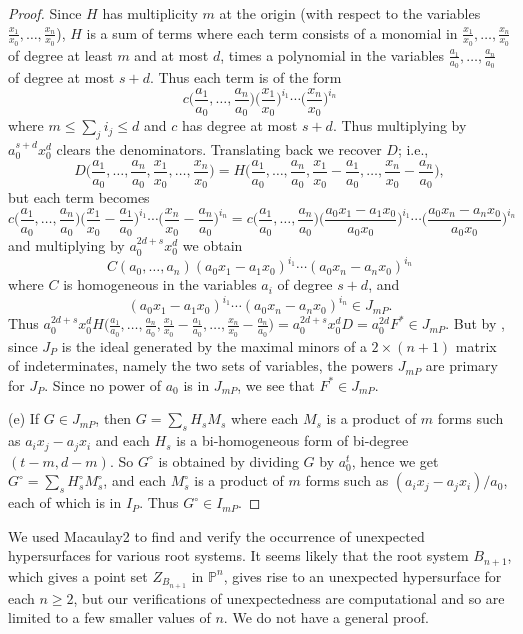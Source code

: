 \documentclass[12pt]{amsart}
\numberwithin{equation}{section}
\theoremstyle{definition}
\newcommand{\PP}{ \ensuremath{\mathbb{P}}}
\begin{document}
\begin{proof}
Since $H$ has multiplicity $m$ at the origin (with respect to the variables $\frac{x_1}{x_0},\ldots,\frac{x_n}{x_0}$),
$H$ is a sum of terms where each term consists of a monomial in $\frac{x_1}{x_0},\ldots,\frac{x_n}{x_0}$ of degree at least $m$ and at most $d$,
times a polynomial in the variables $\frac{a_1}{a_0},\ldots,\frac{a_n}{a_0}$ of degree at most $s+d$. Thus each term is of the form
$$c\big(\frac{a_1}{a_0},\ldots,\frac{a_n}{a_0}\big)\big(\frac{x_1}{x_0}\big)^{i_1}\cdots\big(\frac{x_n}{x_0}\big)^{i_n}$$
where $m\leq \sum_ji_j\leq d$ and $c$ has degree at most $s+d$. Thus multiplying by $a_0^{s+d}x_0^d$ clears the denominators.
Translating back we recover $D$; i.e., 
$$D\big(\frac{a_1}{a_0},\ldots,\frac{a_n}{a_0},\frac{x_1}{x_0},\ldots,\frac{x_n}{x_0}\big)=
H\big(\frac{a_1}{a_0},\ldots,\frac{a_n}{a_0},\frac{x_1}{x_0}-\frac{a_1}{a_0},\ldots,\frac{x_n}{x_0}-\frac{a_n}{a_0}\big),$$
but each term becomes
$$c\big(\frac{a_1}{a_0},\ldots,\frac{a_n}{a_0}\big)\big(\frac{x_1}{x_0}-\frac{a_1}{a_0}\big)^{i_1}\cdots\big(\frac{x_n}{x_0}-\frac{a_n}{a_0}\big)^{i_n}
=c\big(\frac{a_1}{a_0},\ldots,\frac{a_n}{a_0}\big)\big(\frac{a_0x_1-a_1x_0}{a_0x_0}\big)^{i_1}\cdots\big(\frac{a_0x_n-a_nx_0}{a_0x_0}\big)^{i_n}$$
and multiplying by $a_0^{2d+s}x_0^d$ we obtain
$$C(a_0,\ldots,a_n)(a_0x_1-a_1x_0)^{i_1}\cdots(a_0x_n-a_nx_0)^{i_n}$$
where $C$ is homogeneous in the variables $a_i$ of degree $s+d$, and 
$$(a_0x_1-a_1x_0)^{i_1}\cdots(a_0x_n-a_nx_0)^{i_n}\in J_{mP}.$$
Thus $a_0^{2d+s}x_0^dH\big(\frac{a_1}{a_0},\ldots,\frac{a_n}{a_0},\frac{x_1}{x_0}-\frac{a_1}{a_0},\ldots,\frac{x_n}{x_0}-\frac{a_n}{a_0}\big)=
a_0^{2d+s}x_0^dD=a_0^{2d}F^*\in J_{mP}$. But by \cite[Corollary 7.10]{BV}, since $J_P$ is the ideal generated by the 
maximal minors of a $2 \times (n+1)$ matrix of indeterminates, namely the two sets of variables, the powers $J_{mP}$ are primary for $J_P$.
Since no power of $a_0$ is in $J_{mP}$, we see that $F^*\in J_{mP}$.

(e) If $G\in J_{mP}$, then $G=\sum_s H_sM_s$ where each $M_s$ is a product of $m$ forms such as $a_ix_j-a_jx_i$ and each $H_s$
is a bi-homogeneous form of bi-degree $(t-m,d-m)$. So $G^\circ$ is obtained by dividing $G$ by $a_0^t$, hence we get 
$G^\circ=\sum_s H_s^\circ M_s^\circ$, and each $M_s^\circ$ is a product of $m$ forms such as $(a_ix_j-a_jx_i)/a_0$, each of
which is in $I_P$. Thus $G^\circ\in I_{mP}$.

\end{proof}

We used Macaulay2 \cite{M2} to find and verify the occurrence of unexpected hypersurfaces for various root systems.
It seems likely that the root system $B_{n+1}$, which gives a point set $Z_{B_{n+1}}$ in $\PP^n$, gives rise to an unexpected hypersurface
for each $n\geq 2$, but our verifications of unexpectedness are computational and so are limited to a few smaller values of $n$. 
We do not have a general proof. 
\end{document}

